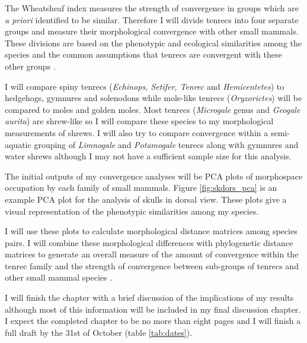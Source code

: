 \documentclass[12pt,a4paper]{article}
\begin{document}
	The Wheatsheaf index \citep{Arbuckle2014} measures the strength of convergence in groups which are \textit{a priori} identified to be similar. Therefore I will divide tenrecs into four separate groups and measure their morphological convergence with other small mammals. These divisions are based on the phenotypic and ecological similarities among the species and the common assumptions that tenrecs are convergent with these other groups \citep[e.g.][]{Soarimalala2011, Olson2013}. 
	
	I will compare spiny tenrecs (\textit{Echinops, Setifer, Tenrec} and \textit{Hemicentetes}) to hedgehogs, gymnures and solenodons while mole-like tenrecs (\textit{Oryzorictes}) will be compared to moles and golden moles. Most tenrecs (\textit{Microgale} genus and \textit{Geogale aurita}) are shrew-like so I will compare these species to my morphological measurements of shrews. I will also try to compare convergence within a semi-aquatic grouping of \textit{Limnogale} and \textit{Potamogale} tenrecs along with gymnures and water shrews although I may not have a sufficient sample size for this analysis. 
	
	The initial outputs of my convergence analyses will be PCA plots of morphospace occupation by each family of small mammals. Figure \ref{fig:skdors_pca} is an example PCA plot for the analysis of skulls in dorsal view. These plots give a visual representation of the phenotypic similarities among my species.

	I will use these plots to calculate morphological distance matrices among species pairs. I will combine these morphological differences with phylogenetic distance matrices to generate an overall measure of the amount of convergence within the tenrec family \citep{Stayton2008} and the strength of convergence between sub-groups of tenrecs and other small mammal species \citep{Arbuckle2014}.
	
	I will finish the chapter with a brief discussion of the implications of my results although most of this information will be included in my final discussion chapter. I expect the completed chapter to be no more than eight pages and I will finish a full draft by the 31st of October (table \ref{tab:dates}).
	
\end{document}
